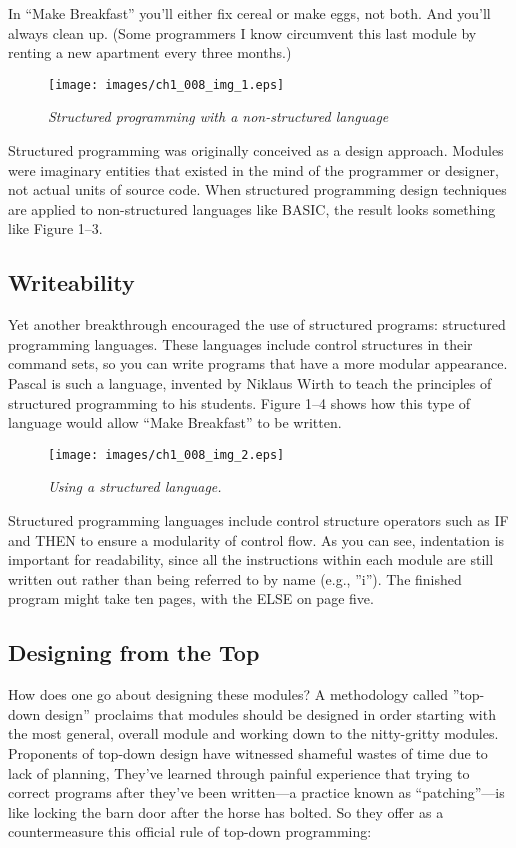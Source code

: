 In {}``Make Breakfast'' you'll either fix cereal or make eggs, not
both. And you'll always clean up. (Some programmers I know circumvent
this last module by renting a new apartment every three months.)

%
\begin{figure}

\caption{\emph{Structured programming with a non-structured language}}

\texttt{[image: images/ch1\_008\_img\_1.eps]}
\end{figure}
Structured programming was originally conceived as a design approach.
Modules were imaginary entities that existed in the mind of the programmer
or designer, not actual units of source code. When structured programming
design techniques are applied to non-structured languages like BASIC,
the result looks something like Figure 1--3.


\subsection*{Writeability}

Yet another breakthrough encouraged the use of structured programs:
structured programming languages. These languages include control
structures in their command sets, so you can write programs that have
a more modular appearance. Pascal is such a language, invented by
Niklaus Wirth to teach the principles of structured programming to
his students. Figure 1--4 shows how this type of language would allow
{}``Make Breakfast'' to be written.

%
\begin{figure}

\caption{\emph{Using a structured language.}}

\texttt{[image: images/ch1\_008\_img\_2.eps]}
\end{figure}
Structured programming languages include control structure operators
such as IF and THEN to ensure a modularity of control flow. As you
can see, indentation is important for readability, since all the instructions
within each module are still written out rather than being referred
to by name (e.g., ''i''). The finished program might take ten pages,
with the ELSE on page five.


\subsection*{Designing from the Top}

How does one go about designing these modules? A methodology called
''top-down design'' proclaims that modules should be designed in order
starting with the most general, overall module and working down to
the nitty-gritty modules. Proponents of top-down design have witnessed
shameful wastes of time due to lack of planning, They've learned through
painful experience that trying to correct programs after they've been
written---a practice known as {}``patching''---is like locking the
barn door after the horse has bolted. So they offer as a countermeasure
this official rule of top-down programming:

